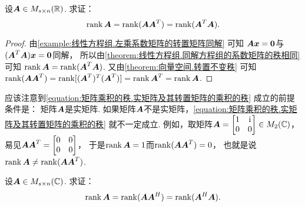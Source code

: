 \begin{example}
设\(\boldsymbol{A} \in M_{s \times n}(\mathbb{R})\).
求证：\begin{equation}\label{equation:矩阵乘积的秩.实矩阵及其转置矩阵的乘积的秩}
	\rank\boldsymbol{A} = \rank(\boldsymbol{A} \boldsymbol{A}^T) = \rank(\boldsymbol{A}^T \boldsymbol{A}).
\end{equation}
\begin{proof}
由\cref{example:线性方程组.左乘系数矩阵的转置矩阵同解} 可知
\(\boldsymbol{A} \boldsymbol{x} = \boldsymbol0\)与\((\boldsymbol{A}^T \boldsymbol{A}) \boldsymbol{x} = \boldsymbol0\)同解，
所以由\cref{theorem:线性方程组.同解方程组的系数矩阵的秩相同} 可知
\(\rank\boldsymbol{A} = \rank(\boldsymbol{A}^T \boldsymbol{A})\).
又由\cref{theorem:向量空间.转置不变秩} 可知
\(\rank(\boldsymbol{A} \boldsymbol{A}^T)
= \rank[(\boldsymbol{A}^T)^T (\boldsymbol{A}^T)]
= \rank\boldsymbol{A}^T
= \rank\boldsymbol{A}\).
\end{proof}
\end{example}
\begin{remark}
应该注意到\cref{equation:矩阵乘积的秩.实矩阵及其转置矩阵的乘积的秩} 成立的前提条件是：
矩阵\(\boldsymbol{A}\)是实矩阵.
如果矩阵\(\boldsymbol{A}\)不是实矩阵，\cref{equation:矩阵乘积的秩.实矩阵及其转置矩阵的乘积的秩} 就不一定成立.
例如，取矩阵\(\boldsymbol{A} = \begin{bmatrix}
	1 & \kern1pt\mathrm{i}\kern1pt \\
	0 & 0
\end{bmatrix}
\in M_2(\mathbb{C})\)，
易见\(\boldsymbol{A} \boldsymbol{A}^T = \begin{bmatrix}
	0 & 0 \\
	0 & 0
\end{bmatrix}\)，
于是\(\rank\boldsymbol{A}=1\)而\(\rank(\boldsymbol{A}\boldsymbol{A}^T)=0\)，
也就是说\(\rank\boldsymbol{A}\neq\rank(\boldsymbol{A}\boldsymbol{A}^T)\).
\end{remark}
\begin{example}
设\(\boldsymbol{A} \in M_{s \times n}(\mathbb{C})\).
求证：\begin{equation}
	\rank\boldsymbol{A} = \rank(\boldsymbol{A} \boldsymbol{A}^H) = \rank(\boldsymbol{A}^H \boldsymbol{A}).
\end{equation}
\end{example}

